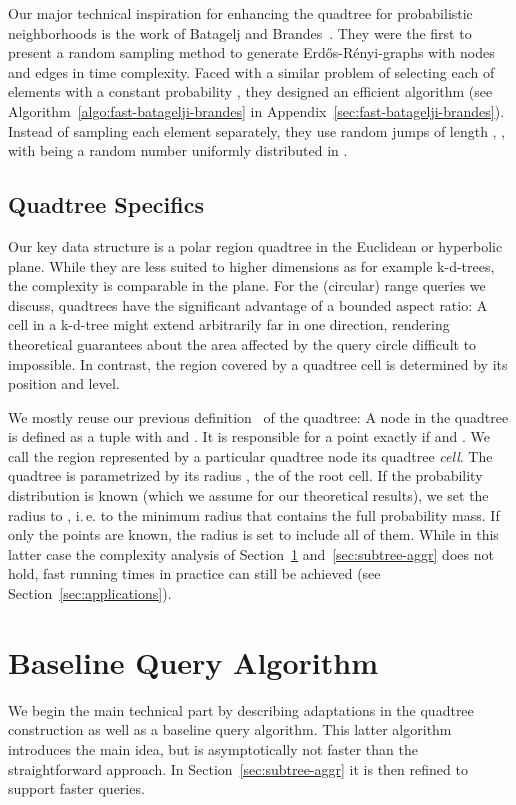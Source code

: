 \documentclass{llncs}
\newcommand{\ie}{i.\,e.\xspace}
\begin{document}
Our major technical inspiration for enhancing the quadtree for probabilistic neighborhoods is the work of 
Batagelj and Brandes~\cite{batagelj2005efficient}. They were the first to present a random sampling 
method to generate Erd\H{o}s-R\'{e}nyi-graphs with  nodes and  edges in  time complexity.
Faced with a similar problem of selecting each of  elements with a constant probability , they designed an 
efficient algorithm (see Algorithm~\ref{algo:fast-batagelji-brandes} in Appendix~\ref{sec:fast-batagelji-brandes}).
Instead of sampling each element separately, they use random jumps of length ,
, with  being a random number uniformly distributed in .


\subsection{Quadtree Specifics}
\label{sub:prelim-quadtree}
Our key data structure is a polar region quadtree in the Euclidean or hyperbolic plane.
While they are less suited to higher dimensions as for example k-d-trees, the complexity is comparable in the plane.
For the (circular) range queries we discuss, quadtrees have the significant advantage of a bounded aspect ratio:
A cell in a k-d-tree might extend arbitrarily far in one direction, rendering theoretical guarantees about the area affected by the query circle difficult to impossible.
In contrast, the region covered by a quadtree cell is determined by its position and level.

We mostly reuse our previous definition~\cite{Looz2015HRG} of the quadtree:
A node in the quadtree is defined as a tuple 
with  and .
It is responsible for a point  exactly if
 and .
We call the region represented by a particular quadtree node its quadtree \emph{cell}.
The quadtree is parametrized by its radius , the  of the root cell.
If the probability distribution  is known (which we assume for our theoretical results), 
we set the radius  to , \ie to the minimum radius that contains the full probability mass.
If only the points are known, the radius is set to include all of them.
While in this latter case the complexity analysis of Section~\ref{sec:baseline} and~\ref{sec:subtree-aggr} does not hold,
fast running times in practice can still be achieved (see Section~\ref{sec:applications}).

 
\section{Baseline Query Algorithm}
\label{sec:baseline}
We begin the main technical part by describing adaptations in the quadtree construction as well as
a baseline query algorithm. This latter algorithm introduces the main idea, but is asymptotically not faster than the 
straightforward approach. In Section~\ref{sec:subtree-aggr} it is then refined to support faster queries.
\end{document}
